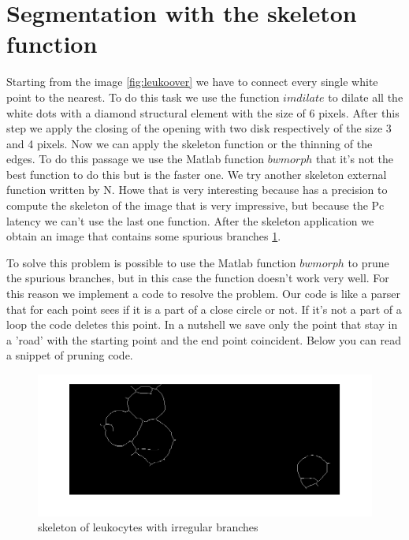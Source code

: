 \section{Segmentation with the skeleton function}
Starting from the image \ref{fig:leukoover} we have to connect every single white point to the nearest. To do this task we use the function $imdilate$ to dilate all the white dots with a diamond structural element with the size of 6 pixels. After this step we apply the closing of the opening with two disk respectively of the size 3 and 4 pixels. Now we can apply the skeleton function or the thinning of the edges. To do this passage we use the Matlab function $bwmorph$ that it's not the best function to do this but is the faster one. We try another skeleton external function written by N. Howe that is very interesting because has a precision to compute the skeleton of the image that is very impressive, but because the Pc latency we can't use the last one function. After the skeleton application we obtain an image that contains some spurious branches \ref{fig:skel}. 

\bigskip

To solve this problem is possible to use the Matlab function $bwmorph$ to prune the spurious branches, but in this case the function doesn’t work very well. For this reason we implement a code to resolve the problem. Our code is like a parser that for each point sees if it is a part of a close circle or not. If it's not a part of a loop the code deletes this point. In a nutshell we save only the point that stay in a 'road' with the starting point and the end point coincident. Below you can read a snippet of pruning code.
\begin{figure}
	\begin{center}
		\centering
		\includegraphics[scale=0.5]{img/skel.png}
		\caption{skeleton of leukocytes with irregular branches}
		\label{fig:skel}
	\end{center}
\end{figure}

